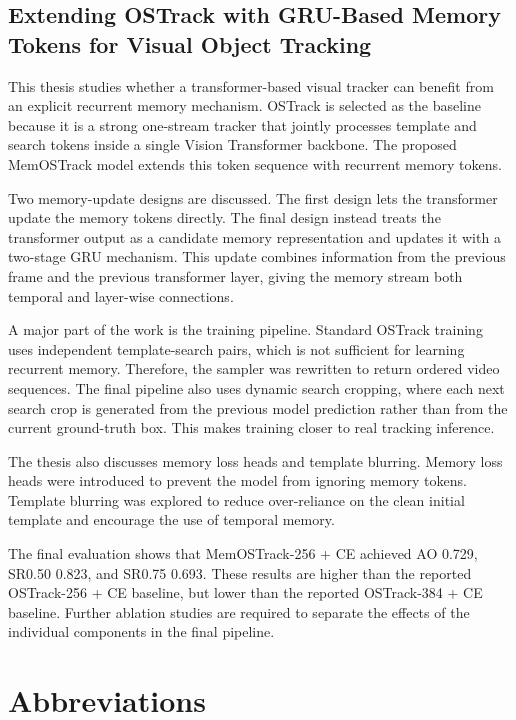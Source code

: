 \documentclass[bachelorthesis]{fer}
\numberwithin{equation}{chapter}
\begin{document}
    \section*{Extending OSTrack with GRU-Based Memory Tokens for Visual Object Tracking}

    This thesis studies whether a transformer-based visual tracker can benefit from an
    explicit recurrent memory mechanism. OSTrack is selected as the baseline because it is a
    strong one-stream tracker that jointly processes template and search tokens inside a
    single Vision Transformer backbone. The proposed MemOSTrack model extends this token
    sequence with recurrent memory tokens.

    Two memory-update designs are discussed. The first design lets the transformer update
    the memory tokens directly. The final design instead treats the transformer output as a
    candidate memory representation and updates it with a two-stage GRU mechanism. This
    update combines information from the previous frame and the previous transformer layer,
    giving the memory stream both temporal and layer-wise connections.

    A major part of the work is the training pipeline. Standard OSTrack training uses
    independent template-search pairs, which is not sufficient for learning recurrent
    memory. Therefore, the sampler was rewritten to return ordered video sequences. The
    final pipeline also uses dynamic search cropping, where each next search crop is
    generated from the previous model prediction rather than from the current ground-truth
    box. This makes training closer to real tracking inference.

    The thesis also discusses memory loss heads and template blurring. Memory loss heads
    were introduced to prevent the model from ignoring memory tokens. Template blurring was
    explored to reduce over-reliance on the clean initial template and encourage the use of
    temporal memory.

    The final evaluation shows that MemOSTrack-256 + CE achieved AO 0.729, SR0.50
    0.823, and SR0.75 0.693. These results are higher than the reported OSTrack-256 + CE
    baseline, but lower than the reported OSTrack-384 + CE baseline. Further ablation
    studies are required to separate the effects of the individual components in the final
    pipeline.

    \chapter*{Abbreviations}
\end{document}
